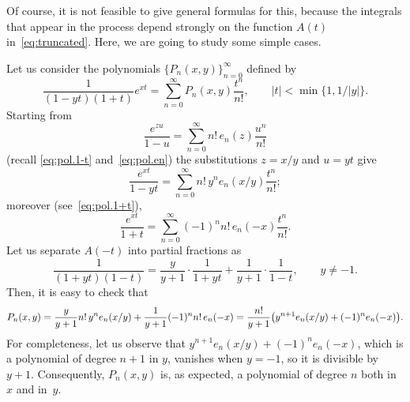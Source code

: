 \documentclass[11pt,a4paper]{amsart}
\theoremstyle{plain}
\theoremstyle{plain}
\theoremstyle{remark}
\numberwithin{equation}{section}
\begin{document}
Of course, it is not feasible to give general formulas for this, because the integrals that appear in the process depend strongly on the function $A(t)$ in~\eqref{eq:truncated}. Here, we are going to study some simple cases.

Let us consider the polynomials $\{P_n(x,y)\}_{n=0}^\infty$ defined by
\begin{equation*}
  \frac{1}{(1-yt)(1+t)}e^{xt} = \sum_{n=0}^{\infty} P_n(x,y) \frac{t^n}{n!}, 
  \qquad |t| < \min\{1,1/|y|\}.
\end{equation*}
Starting from
\[
  \frac{e^{zu}}{1-u} = \sum_{n=0}^{\infty} n!\, e_n(z) \frac{u^n}{n!}
\]
(recall \eqref{eq:pol.1-t} and~\eqref{eq:pol.en}) the substitutions $z=x/y$ and $u=yt$ give
\[
  \frac{e^{xt}}{1-yt} = \sum_{n=0}^{\infty} n!\, y^n e_n(x/y) \frac{t^n}{n!};
\]
moreover (see~\eqref{eq:pol.1+t}),
\[
  \frac{e^{xt}}{1+t} = \sum_{n=0}^{\infty} (-1)^n n!\, e_n(-x) \frac{t^n}{n!}.
\]
Let us separate $A(-t)$ into partial fractions as
\[
  \frac{1}{(1+yt)(1-t)} = \frac{y}{y+1} \cdot \frac{1}{1+yt} + \frac{1}{y+1} \cdot \frac{1}{1-t},
  \qquad y \ne -1.
\]
Then, it is easy to check that
\begin{equation*}
  P_n(x,y) = \frac{y}{y+1} n!\, y^n e_n(x/y) + \frac{1}{y+1} (-1)^n n!\, e_n(-x) \\
  = \frac{n!}{y+1} \big( y^{n+1} e_n(x/y) + (-1)^n e_n(-x)\big).
\end{equation*}
For completeness, let us observe that $y^{n+1} e_n(x/y) + (-1)^n e_n(-x)$, which is a polynomial of degree $n+1$ in $y$, vanishes when $y=-1$, so it is divisible by $y+1$. Consequently, $P_n(x,y)$ is, as expected, a polynomial of degree $n$ both in $x$ and in~$y$.
\end{document}
